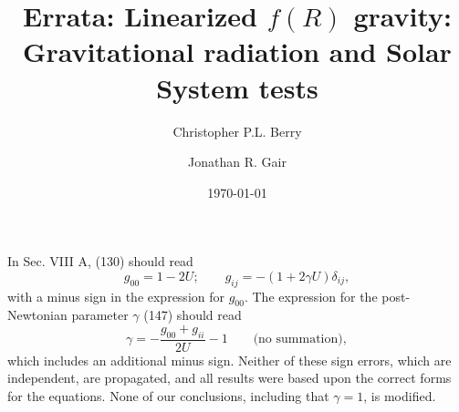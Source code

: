 \documentclass[aps,prd,amsfonts,amssymb,amsmath,nofootinbib,reprint,showpacs,onecolumn]{revtex4-1}
\begin{document}

\title{Errata: Linearized $f(R)$ gravity: Gravitational radiation and Solar System tests\\[Phys.\ Rev.\ D 83, 104022 (2011)]}

\author{Christopher P.L. Berry}
\author{Jonathan R. Gair}

\date{\today}


\maketitle

In Sec. VIII A, (130) should read
\begin{equation}
g_{00} = 1 - 2U; \qquad g_{ij} = -(1 + 2\gamma U)\delta_{ij},
\end{equation}
with a minus sign in the expression for $g_{00}$. The expression for the post-Newtonian parameter $\gamma$ (147) should read
\begin{equation}
\gamma = -\frac{g_{00} + g_{ii}}{2U} - 1 \qquad \text{(no summation)},
\end{equation}
which includes an additional minus sign. Neither of these sign errors, which are independent, are propagated, and all results were based upon the correct forms for the equations. None of our conclusions, including that $\gamma = 1$, is modified.
\end{document}
